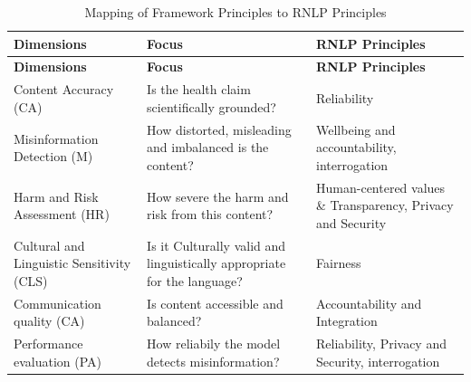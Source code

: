 \documentclass[]{article}
\begin{document}
\begin{longtable}[]{@{}
  >{\raggedright\arraybackslash}p{}
  >{\raggedright\arraybackslash}p{}
  >{\raggedright\arraybackslash}p{}@{}}
\caption{Mapping of Framework Principles to
RNLP Principles}\tabularnewline
\toprule\noalign{}
\begin{minipage}[b]{\linewidth}\raggedright
\textbf{Dimensions}
\end{minipage} & \begin{minipage}[b]{\linewidth}\raggedright
\textbf{Focus}
\end{minipage} & \begin{minipage}[b]{\linewidth}\raggedright
\textbf{RNLP Principles}
\end{minipage} \\
\midrule\noalign{}
\endfirsthead
\toprule\noalign{}
\begin{minipage}[b]{\linewidth}\raggedright
\textbf{Dimensions}
\end{minipage} & \begin{minipage}[b]{\linewidth}\raggedright
\textbf{Focus}
\end{minipage} & \begin{minipage}[b]{\linewidth}\raggedright
\textbf{RNLP Principles}
\end{minipage} \\
\midrule\noalign{}
\endhead
\bottomrule\noalign{}
\endlastfoot
Content Accuracy (CA) & Is the health claim scientifically grounded? &
Reliability \\
Misinformation Detection (M) & How distorted, misleading and imbalanced
is the content? & Wellbeing and accountability, interrogation \\
Harm and Risk Assessment (HR) & How severe the harm and risk from this
content? & Human-centered values \& Transparency, Privacy and
Security \\
Cultural and Linguistic Sensitivity (CLS) & Is it Culturally valid and
linguistically appropriate for the language? & Fairness \\
Communication quality (CA) & Is content accessible and balanced? &
Accountability and Integration \\
Performance evaluation (PA) & How reliabily the model detects
misinformation? & Reliability, Privacy and Security, interrogation \\
\end{longtable}
\end{document}
